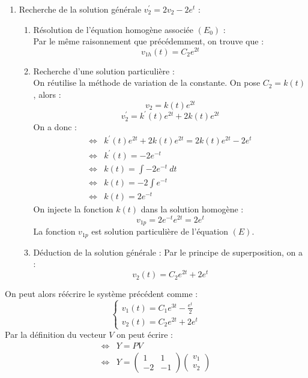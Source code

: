 \begin{ex}
\begin{enumerate}
    \item Recherche de la solution générale $v_2^{\prime}=2v_2-2e^t$ :\\
    \begin{enumerate}
        \item Résolution de l'équation homogène associée $(E_0)$ :\\
        Par le même raisonnement que précédemment, on trouve que :
        $$v_{1h}(t)=C_2e^{2t}$$
        \item Recherche d'une solution particulière :\\
        On réutilise la méthode de variation de la constante.
        On pose $C_2=k(t)$, alors :
        $$v_2=k(t)e^{2t}$$
        $$v_2^{\prime}=k^{\prime}(t)e^{2t}+2k(t)e^{2t}$$
        On a donc :
        \begin{align*}
            \Leftrightarrow & k^{\prime}(t)e^{2t}+2k(t)e^{2t}=2k(t)e^{2t}-2e^t\\
            \Leftrightarrow & k^{\prime}(t)=-2e^{-t}\\
            \Leftrightarrow & k(t) = \int -2e^{-t}\ dt\\
            \Leftrightarrow & k(t) = -2\int e^{-t}\\
            \Leftrightarrow & k(t) = 2e^{-t}
        \end{align*}
        On injecte la fonction $k(t)$ dans la solution homogène :
        $$v_{1p}=2e^{-t}e^{2t}=2e^{t}$$
        La fonction $v_{1p}$ est solution particulière de l'équation $(E)$.
        \item Déduction de la solution générale :
        Par le principe de superposition, on a :
        $$v_2(t)=C_2e^{2t}+2e^t$$
    \end{enumerate}
\end{enumerate}
On peut alors réécrire le système précédent comme :
$$\begin{cases}
v_1(t)=C_1e^{3t}-\frac{e^t}{2}\\
v_2(t)=C_2e^{2t}+2e^t
\end{cases}$$
Par la définition du vecteur $V$ on peut écrire :
\begin{align*}
    \Leftrightarrow & Y=PV\\
    \Leftrightarrow & Y=\begin{pmatrix}1&1\\-2&-1\end{pmatrix}\begin{pmatrix}v_1\\v_2\end{pmatrix}\\

\end{align*}
\end{ex}
